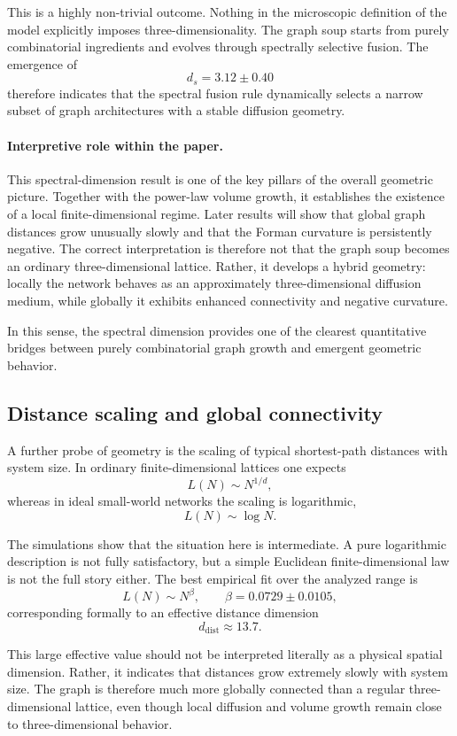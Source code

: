 \documentclass[11pt]{article}
\begin{document}
This is a highly non-trivial outcome.
Nothing in the microscopic definition of the model explicitly imposes three-dimensionality.
The graph soup starts from purely combinatorial ingredients and evolves through spectrally selective fusion.
The emergence of
\[
d_s = 3.12 \pm 0.40
\]
therefore indicates that the spectral fusion rule dynamically selects a narrow subset of graph architectures with a stable diffusion geometry.

\paragraph{Interpretive role within the paper.}

This spectral-dimension result is one of the key pillars of the overall geometric picture.
Together with the power-law volume growth, it establishes the existence of a local finite-dimensional regime.
Later results will show that global graph distances grow unusually slowly and that the Forman curvature is persistently negative.
The correct interpretation is therefore not that the graph soup becomes an ordinary three-dimensional lattice.
Rather, it develops a hybrid geometry:
locally the network behaves as an approximately three-dimensional diffusion medium, while globally it exhibits enhanced connectivity and negative curvature.

In this sense, the spectral dimension provides one of the clearest quantitative bridges between purely combinatorial graph growth and emergent geometric behavior.
\subsection{Distance scaling and global connectivity}
\label{sec:distance_scaling}

A further probe of geometry is the scaling of typical shortest-path distances with system size.
In ordinary finite-dimensional lattices one expects
\[
L(N)\sim N^{1/d},
\]
whereas in ideal small-world networks the scaling is logarithmic,
\[
L(N)\sim \log N.
\]

The simulations show that the situation here is intermediate.
A pure logarithmic description is not fully satisfactory, but a simple Euclidean finite-dimensional law is not the full story either.
The best empirical fit over the analyzed range is
\[
L(N)\sim N^\beta,
\qquad
\beta = 0.0729 \pm 0.0105,
\]
corresponding formally to an effective distance dimension
\[
d_{\mathrm{dist}} \approx 13.7.
\]

This large effective value should not be interpreted literally as a physical spatial dimension.
Rather, it indicates that distances grow extremely slowly with system size.
The graph is therefore much more globally connected than a regular three-dimensional lattice, even though local diffusion and volume growth remain close to three-dimensional behavior.
\end{document}
